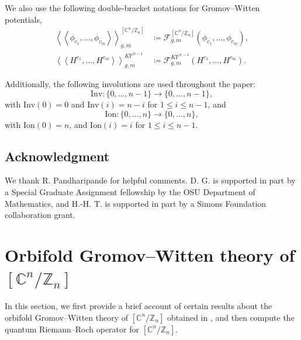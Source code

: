 \documentclass[12pt]{amsart}
\numberwithin{equation}{section}
\newcommand{\CnZn}{[\mathbb{C}^n/\mathbb{Z}_n]}
\newcommand{\KP}{K\mathbb{P}}
\begin{document}
We also use the following double-bracket notations for Gromov--Witten potentials, 
\begin{equation*}
\begin{aligned}
\left\langle\left\langle\phi_{c_{1}}, \ldots, \phi_{c_{m}}\right\rangle\right\rangle_{g, m}^{\left[\mathbb{C}^{n} / \mathbb{Z}_{n}\right]}
&\coloneq \mathcal{F}_{g, m}^{\left[\mathbb{C}^{n} / \mathbb{Z}_{n}\right]}\left(\phi_{c_{1}}, \ldots, \phi_{c_{m}}\right),\\
\left\langle\left\langle H^{c_{1}}, \ldots, H^{c_{m}}\right\rangle\right\rangle_{g, m}^{\KP^{n-1}}
&\coloneq \mathcal{F}_{g, m}^{\KP^{n-1}}\left(H^{c_{1}}, \ldots, H^{c_{m}}\right).
\end{aligned}
\end{equation*}

Additionally, the following involutions are used throughout the paper:
$$\mathrm{Inv}:\{0,...,n-1\}\rightarrow\{0,...,n-1\},$$ with $\mathrm{Inv}(0)=0$ and $\mathrm{Inv}(i)=n-i$ for $1\leq i \leq n-1$, and 
$$\mathrm{Ion}:\{0,...,n\}\rightarrow\{0,...,n\},$$ with $\mathrm{Ion}(0)=n$, and $\mathrm{Ion}(i)=i$ for $1\leq i \leq n-1$.


\subsection{Acknowledgment}
We thank R. Pandharipande for helpful comments. D. G. is supported in part by a Special Graduate Assignment fellowship by the OSU Department of Mathematics, and H.-H. T. is supported in part by a Simons Foundation collaboration grant.






\section{Orbifold Gromov--Witten theory of \texorpdfstring{$[\mathbb{C}^n/\mathbb{Z}_n]$}{CnZn}}\label{sec:GWCnZn}

 In this section, we first provide a brief account of certain results about the orbifold Gromov--Witten theory of $\CnZn$ obtained in \cite{gt}, and then compute the quantum Riemann--Roch operator for $\CnZn$.
 
\end{document}
